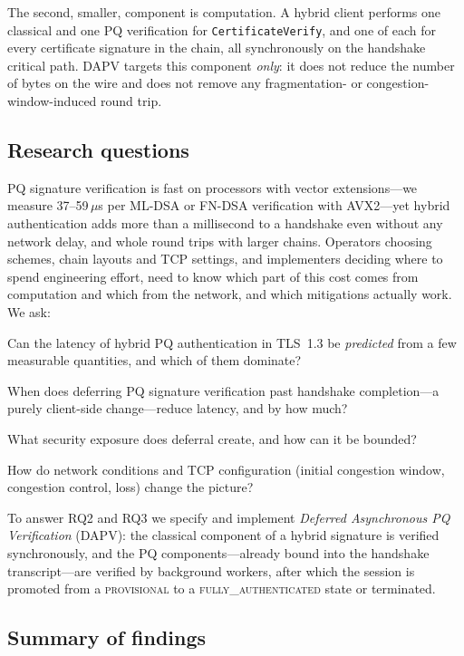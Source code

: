 \documentclass[preprint,10pt,3p]{elsarticle}
\newcommand{\state}[1]{\textsc{#1}}
\begin{document}
The second, smaller, component is computation.  A hybrid client performs
one classical and one PQ verification for \texttt{CertificateVerify}, and
one of each for every certificate signature in the chain, all
synchronously on the handshake critical path.  DAPV targets this component
\emph{only}: it does not reduce the number of bytes on the wire and does
not remove any fragmentation- or congestion-window-induced round trip.

\subsection{Research questions}

PQ signature verification is fast on processors with vector
extensions---we measure 37--59\,$\mu$s per ML-DSA or FN-DSA verification
with AVX2---yet hybrid authentication adds more than a millisecond to a
handshake even without any network delay, and whole round trips with
larger chains.  Operators choosing schemes, chain layouts and TCP settings,
and implementers deciding where to spend engineering effort, need to know
which part of this cost comes from computation and which from the network,
and which mitigations actually work.  We ask:
\begin{description}[leftmargin=2.2em, style=nextline, itemsep=2pt]
\item[RQ1] Can the latency of hybrid PQ authentication in TLS~1.3 be
  \emph{predicted} from a few measurable quantities, and which of them
  dominate?
\item[RQ2] When does deferring PQ signature verification past handshake
  completion---a purely client-side change---reduce latency, and by how
  much?
\item[RQ3] What security exposure does deferral create, and how can it be
  bounded?
\item[RQ4] How do network conditions and TCP configuration (initial
  congestion window, congestion control, loss) change the picture?
\end{description}

To answer RQ2 and RQ3 we specify and implement \textit{Deferred
Asynchronous PQ Verification} (DAPV): the classical component of a hybrid
signature is verified synchronously, and the PQ components---already bound
into the handshake transcript---are verified by background workers, after
which the session is promoted from a \state{provisional} to a
\state{fully\_authenticated} state or terminated.

\subsection{Summary of findings}
\end{document}
